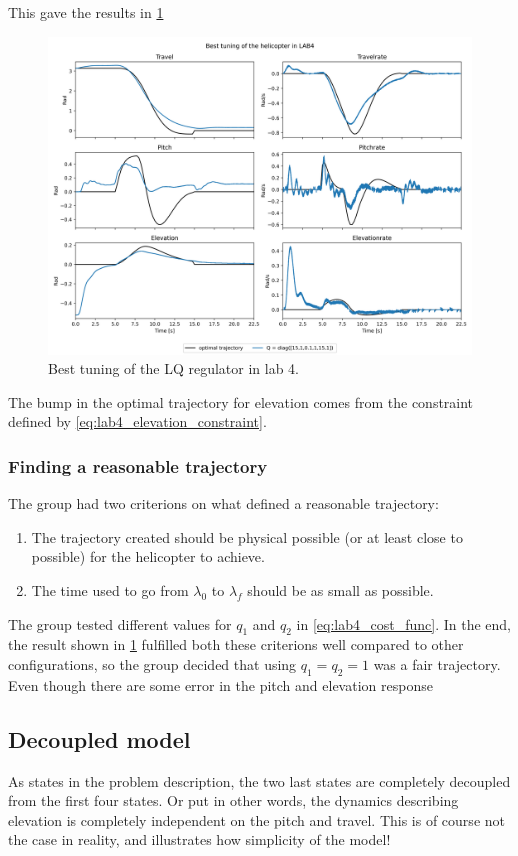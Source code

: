 \documentclass[../main.tex]{subfiles}
\begin{document}
This gave the results in \cref{fig:LAB4_best_tuning}
\begin{figure}[h]
	\centering
	\includegraphics[width=\linewidth]{figures/LAB4_best_tunings.png}
	\caption{Best tuning of the LQ regulator in lab 4.}
	\label{fig:LAB4_best_tuning}
\end{figure}
The bump in the optimal trajectory for elevation comes from the constraint defined by \cref{eq:lab4_elevation_constraint}.

\subsubsection{Finding a reasonable trajectory}
The group had two criterions on what defined a reasonable trajectory:
\begin{enumerate}
	\item The trajectory created should be physical possible (or at least close to possible) for the helicopter to achieve.
	\item The time used to go from $ \lambda_0 $ to $ \lambda_f $ should be as small as possible.
\end{enumerate}
The group tested different values for $ q_1 $ and $ q_2 $ in \cref{eq:lab4_cost_func}. In the end, the result shown in \cref{fig:LAB4_best_tuning} fulfilled both these criterions well compared to other configurations, so the group decided that using $ q_1 = q_2 = 1 $ was a fair trajectory. Even though there are some error in the pitch and elevation response

\subsection{Decoupled model} \label{sec:lab4_decoupled}
As states in the problem description, the two last states are completely decoupled from the first four states. Or put in other words, the dynamics describing elevation is completely independent on the pitch and travel. This is of course not the case in reality, and illustrates how simplicity of the model!
\end{document}
